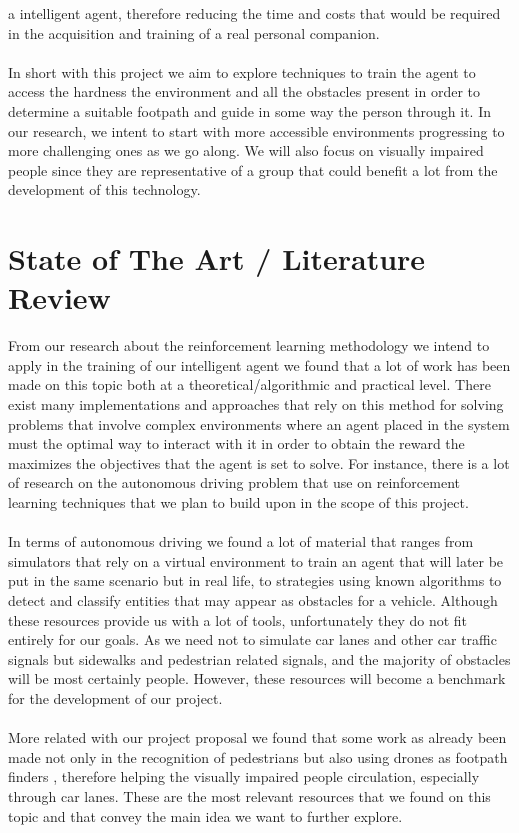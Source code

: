 \documentclass[letterpaper,10pt]{article}
\begin{document}
a intelligent agent, therefore reducing the time and costs that would be 
required in the acquisition and training of a real personal companion. 
\\\\
In short with this project we aim to explore techniques to train the agent to 
access the hardness the environment and all the obstacles present in order
to determine a suitable footpath and guide in some way the person through it.
In our research, we intent to start with more accessible environments 
progressing to more challenging ones as we go along. We will also focus 
on visually impaired people since they are representative of a group that
could benefit a lot from the development of this technology.

\section{State of The Art / Literature Review}

From our research about the reinforcement learning methodology \cite{sutton}
we intend to apply in the training of our intelligent agent we found that a 
lot of work has been made on this topic both at a theoretical/algorithmic
\cite{MARL:overview,DBLP:journals/corr/abs-1911-10635}
and practical level. There exist many implementations and approaches that 
rely on this method for solving problems that involve complex environments 
where an agent placed in the system must the optimal way to interact with 
it in order to obtain the reward the maximizes the objectives that the agent 
is set to solve. For instance, there is a lot of research on the autonomous 
driving problem that use on reinforcement learning techniques that we plan 
to build upon in the scope of this project. 
\\\\
In terms of autonomous driving we found a lot of material that ranges from 
simulators \cite{duckietown-library} that rely on a virtual environment to 
train an agent that will later be put in the same scenario but in real 
life, to strategies using known algorithms \cite{vieira2021openworld} to 
detect and classify entities that may appear as obstacles for a vehicle.
Although these resources provide us with a lot of tools, unfortunately they 
do not fit entirely for our goals. As we need not to simulate car lanes and 
other car traffic signals but sidewalks and pedestrian related signals, and 
the majority of obstacles will be most certainly people. However, these 
resources will become a benchmark for the development of our project.
\\\\
More related with our project proposal we found that some work as already
been made not only in the recognition of pedestrians \cite{dataflair_2021}
but also using drones as footpath finders \cite{tan2021flying}, 
therefore helping the visually impaired people circulation, especially 
through car lanes. These are the most relevant resources that we found on 
this topic and that convey the main idea we want to further explore.
\end{document}
